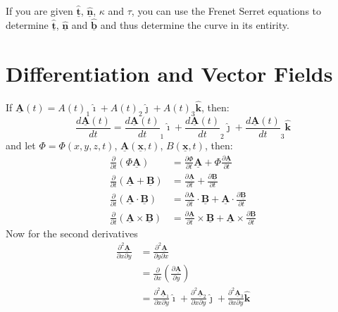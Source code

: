 \documentclass{article}
\renewcommand{\vec}[1]{\underline{\textbf{#1}}}
\newcommand{\uvec}[1]{\hat{\underline{\textbf{#1}}}}
\newcommand{\veci}{\bm{\hat{\imath}}}
\newcommand{\vecj}{\bm{\hat{\jmath}}}
\newcommand{\veck}{\bm{\hat{k}}}
\renewcommand{\k}{\kappa}
\newcommand{\p}{\Phi}
\newcommand{\pa}{\partial}
\newcommand{\pd}[2]{\frac{\partial #1}{\partial #2}}
\newcommand{\fd}[2]{\frac{d #1}{d #2}}
\begin{document}
If you are given $\uvec t$, $\uvec n$, $\k$ and $\tau$, you can use the Frenet Serret equations to determine $\uvec t$, $\uvec n$ and $\uvec b$ and thus determine the curve in its entirity.

\newpage
\section{Differentiation and Vector Fields}
If $\vec A(t) = {A(t)}_1 \veci + {A(t)}_2 \vecj + {A(t)}_3 \veck$, then:
$$ \fd{\vec A(t)}{t} = {\fd{\vec A(t)}{t}}_1 \veci + {\fd{\vec A(t)}{t}}_2 \vecj + {\fd{\vec A(t)}{t}}_3 \veck $$
and let $\p = \p(x, y, z, t)$, $\vec A(\vec x, t)$, $B(\vec x, t)$, then:
\begin{align}
  \pd{}{t}(\p \vec A) &= \pd{\p}{t}\vec A + \p\pd{\vec A}{t} \tag{$*$}\\
  \pd{}{t}(\vec A + \vec B) &= \pd{\vec A}{t} + \pd{\vec B}{t} \tag{$*^2$}\\
  \pd{}{t}(\vec A \cdot \vec B) &= \pd{\vec A}{t}\cdot\vec B + \vec A \cdot\pd{\vec B}{t} \tag{$*^3$}\\
  \pd{}{t}(\vec A \times \vec B) &= \pd{\vec A}{t}\times\vec B + \vec A\times\pd{\vec B}{t} \tag{$*^4$}
\end{align}
Now for the second derivatives
\begin{align*}
  \pd{^2 \vec A}{x\pa y} &= \pd{^2 \vec A}{y\pa x} \\
  &= \pd{}{x}\left(\pd{\vec A}{y} \right)\\
  &= \pd{^2 \vec A_1}{x\pa y}\veci + \pd{^2 \vec A_2}{x\pa y}\vecj + \pd{^2 \vec A_3}{x\pa y}\veck \\
\end{align*}
\end{document}
